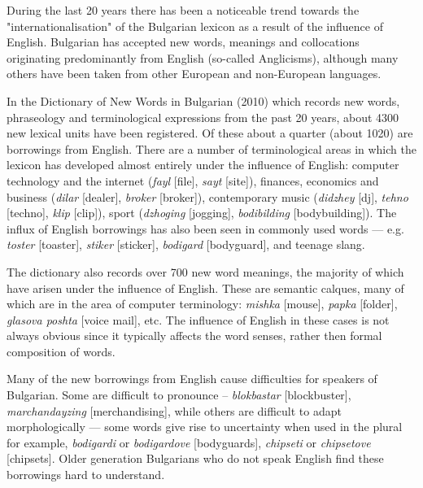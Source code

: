 \documentclass[]{../../metanetpaper}
\begin{document}
\begin{multicols}{2}
During the last 20 years there has been a noticeable trend towards the "internationalisation" of the Bulgarian lexicon as a result of the influence of English. Bulgarian has accepted new words, meanings and collocations originating predominantly from English (so-called Anglicisms), although many others have been taken from other European and non-European languages.

In the Dictionary of New Words in Bulgarian (2010)  \cite{NWDict} which records new words, phraseology and terminological expressions from the past 20 years, about 4300 new lexical units have been registered. Of these about a quarter (about 1020) are borrowings from English. There are a number of terminological areas in which the lexicon has developed almost entirely under the influence of English: computer technology and the internet (\textit{{fayl}} [file], \textit{{sayt}} [site]), finances, economics and business (\textit{{dilar}} [dealer], \textit{{broker}} [broker]), contemporary music (\textit{{didzhey}} [dj], \textit{{tehno}} [techno], \textit{{klip}} [clip]), sport (\textit{{dzhoging}} [jogging], \textit{{bodibilding}} [bodybuilding]). The influx of English borrowings has also been seen in commonly used words — e.g. \textit{{toster}} [toaster], \textit{{stiker}} [sticker], \textit{{bodigard}} [bodyguard], and teenage slang.

The dictionary also records over 700 new word meanings, the majority of which have arisen under the influence of English. These are semantic calques, many of which are in the area of computer terminology: \textit{{mishka}} [mouse], \textit{{papka}} [folder], \textit{{glasova poshta}} [voice mail], etc. The influence of English in these cases is not always obvious since it typically affects the word senses, rather then formal composition of words. 

Many of the new borrowings from English cause difficulties for speakers of Bulgarian. Some are difficult to pronounce – \textit{{blokbastar}} [blockbuster], \textit{{marchandayzing}} [merchandising], while others are difficult to adapt morphologically — some words give rise to uncertainty when used in the plural for example, \textit{{bodigardi}} or \textit{{bodigardove}} [bodyguards], \textit{{chipseti}} or \textit{{chipsetove}} [chipsets]. Older generation Bulgarians who do not speak English find these borrowings hard to understand. 


\end{multicols}
\end{document}
